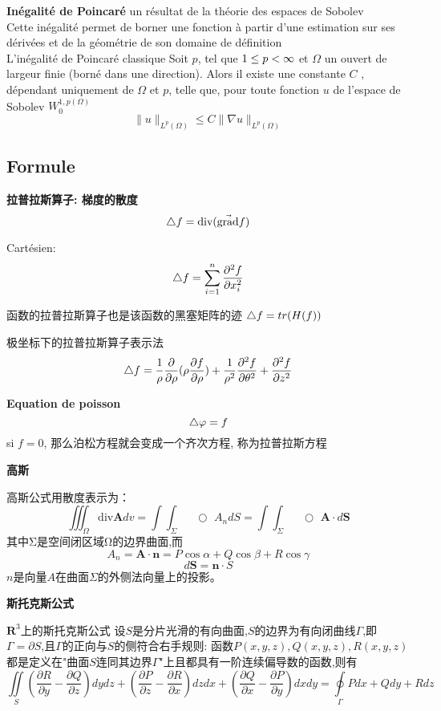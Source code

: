 \documentclass[openany]{book}
\begin{document}
\textbf{In\'egalit\'e de Poincar\'e}
un r\'esultat de la th\'eorie des espaces de Sobolev\\
Cette in\'egalit\'e permet de borner une fonction \`a partir d'une estimation sur ses d\'eriv\'ees et de la g\'eom\'etrie de son domaine de d\'efinition\\
L'in\'egalit\'e de Poincar\'e classique
Soit $p$, tel que $ 1 \leq p < \infty$  et $\Omega$ un ouvert de largeur finie (born\'e dans une direction). Alors il existe une constante  $  C$  , d\'ependant uniquement de $\Omega$ et $p$, telle que, pour toute fonction $u$   de l'espace de Sobolev $W_0^{1,p(\Omega)}$
$$
\| u \|_{L^{p} (\Omega)} \leq C \| \nabla u \|_{L^{p} (\Omega)}
$$

\subsection{Formule}
\textbf{拉普拉斯算子: 梯度的散度}
$$\mathop{}\!\mathbin\bigtriangleup f = \mbox{div} (\vec{\mbox{grad}}f)$$

Cart\'esien: $$\mathop{}\!\mathbin\bigtriangleup f = \sum_{i=1}^n \frac{\partial^2 f }{\partial x_i^2} $$

函数的拉普拉斯算子也是该函数的黑塞矩阵的迹 $\mathop{}\!\mathbin\bigtriangleup f = tr(H(f))$

极坐标下的拉普拉斯算子表示法
$$\mathop{}\!\mathbin\bigtriangleup f = \frac{ 1}{\rho}\frac{\partial  }{\partial \rho}(\rho \frac{\partial  f}{\partial \rho}) + \frac{ 1}{\rho^2}\frac{\partial ^2 f}{\partial\theta^2} + \frac{\partial^2 f}{\partial z^2}$$

\bigskip
\textbf{Equation de poisson}
$$\mathop{}\!\mathbin\bigtriangleup \varphi = f$$
si $f=0$, 那么泊松方程就会变成一个齐次方程, 称为拉普拉斯方程

\bigskip
\textbf{高斯}

高斯公式用散度表示为：
$$
\iiint_{\Omega}\mathrm{div}\mathbf{A}dv=
\int\!\!\!\!\int_{\Sigma}\!\!\!\!\!\!\!\!\!\!\!\!\!\!\;\;\;\bigcirc\,\,A_{n}dS
=
\int\!\!\!\!\int_{\Sigma}\!\!\!\!\!\!\!\!\!\!\!\!\!\!\;\;\;\bigcirc\,\,\mathbf{A}\cdot d\mathbf{S}
$$
其中Σ是空间闭区域Ω的边界曲面,而
$$
A_n=\mathbf{A}\cdot\mathbf{n}=P\cos\alpha+Q\cos\beta+R\cos\gamma
$$
$$
d\mathbf{S}=\mathbf{n}\cdot S
$$
$n$是向量$A$在曲面$\Sigma$的外侧法向量上的投影。

\bigskip
\textbf{斯托克斯公式}

$\mathbf{R}^3$上的斯托克斯公式
设$S$是分片光滑的有向曲面,$S$的边界为有向闭曲线$Γ$,即$\Gamma=\partial S$,且$Γ$的正向与$S$的侧符合右手规则: 函数$P(x,y,z),Q(x,y,z),R(x,y,z)$都是定义在"曲面$S$连同其边界$Γ$"上且都具有一阶连续偏导数的函数,则有
$$\iint\limits_{S}(\frac{\partial R}{\partial y}-\frac{\partial Q}{\partial z})dydz+(\frac{\partial P}{\partial z}-\frac{\partial R}{\partial x})dzdx+(\frac{\partial Q}{\partial x}-\frac{\partial P}{\partial y})dxdy
=\oint\limits_{\Gamma}Pdx+Qdy+Rdz$$
\end{document}
